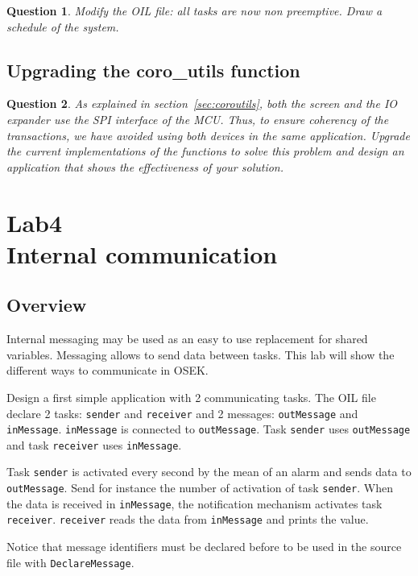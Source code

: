 \documentclass[11pt]{report}
\newtheorem{ex}{Question}
\begin{document}
\begin{ex}
Modify the OIL file: all tasks are now non preemptive. Draw a schedule of the system.
\end{ex}


\section{Upgrading the coro\_utils function}

\begin{ex}
    As explained in section~\ref{sec:coroutils}, both the screen and the IO expander use the SPI interface of the MCU. Thus, to ensure coherency of the transactions, we have avoided using both devices in the same application. Upgrade the current implementations of the functions to solve this problem and design an application that shows the effectiveness of your solution.
\end{ex}

\chapter{Lab4\\Internal communication}

\section{Overview}

Internal messaging may be used as an easy to use replacement for shared variables. Messaging allows to send data between tasks. This lab will show the different ways to communicate in OSEK.

Design a first simple application with 2 communicating tasks.
The OIL file declare 2 tasks: \texttt{sender} and \texttt{receiver} and 2 messages: \texttt{outMessage} and \texttt{inMessage}. \texttt{inMessage} is connected to \texttt{outMessage}. Task \texttt{sender} uses \texttt{outMessage} and task \texttt{receiver} uses \texttt{inMessage}.

Task \texttt{sender} is activated every second by the mean of an alarm and sends data to \texttt{outMessage}.
Send for instance the number of activation of task \texttt{sender}.
When the data is received in \texttt{inMessage}, the notification mechanism activates task \texttt{receiver}.
\texttt{receiver} reads the data from \texttt{inMessage} and prints the value.

Notice that message identifiers must be declared before to be used in the source file with \texttt{DeclareMessage}.
\end{document}
